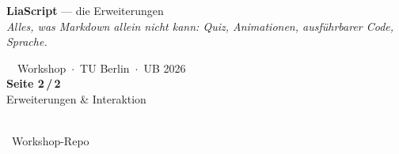 \documentclass[a4paper,landscape,9pt]{extarticle}
\begin{document}
\noindent\begin{tcolorbox}[
  enhanced, frame hidden, sharp corners,
  colback=liagreen, coltext=white,
  left=12pt, right=8pt, top=4pt, bottom=4pt,
  before skip=0pt, after skip=4pt,
  width=\linewidth,
  borderline west={4pt}{-4pt}{liagreen!55}
]
\begin{minipage}[c]{0.66\linewidth}
  {\sffamily\fontsize{26}{28}\selectfont\bfseries LiaScript}\hspace{0.4em}%
  {\sffamily\large\color{white!75} — die Erweiterungen}\\[2pt]
  {\sffamily\footnotesize\itshape\color{white!90} Alles, was Markdown allein nicht kann: Quiz, Animationen, ausführbarer Code, Sprache.}
\end{minipage}\hfill
\begin{minipage}[c]{0.20\linewidth}\raggedright
  {\sffamily\scriptsize\color{white!85}\faGraduationCap~~Workshop~$\cdot$~TU Berlin~$\cdot$~UB 2026}\\[2pt]
  {\sffamily\bfseries\normalsize Seite 2\,/\,2}\\[1pt]
  {\sffamily\scriptsize\color{white!75} Erweiterungen \& Interaktion}
\end{minipage}\hfill
\begin{minipage}[c]{0.10\linewidth}\centering
  {\color{black}\colorbox{white}{\hspace{1pt}\hspace{1pt}}}\\[1pt]
  {\sffamily\scriptsize\color{white!90}\faGithub~Workshop-Repo}
\end{minipage}
\end{tcolorbox}

\newcommand{\aufglia}[1]{\hfill{\sffamily\scriptsize\color{white!85}\faTasks~A#1}}
\end{document}
